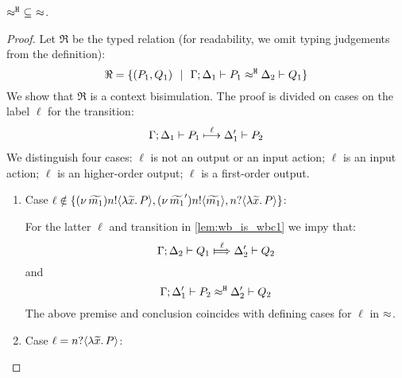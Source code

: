
\begin{lemma}
	\label{app:lem:wb_is_wbc}
	$\approx^\mathtt{H}\ \subseteq\ \approx$.
\end{lemma}

\begin{proof}
	Let $\Re$ be the typed relation (for readability, we omit typing judgements from the definition):
	\[
		\Re = \{(P_1, Q_1) \ \ |\ \  \Gamma; \Delta_1 \vdash P_1 \approx^\mathtt{H} \Delta_2 \vdash Q_1\}
	\]
	We show that $\Re$ is a context bisimulation.
	The proof is divided on cases on the label $\ell$ for the transition:
%
	\begin{eqnarray}
		\Gamma; \Delta_1 \vdash P_1 \stackrel{\ell}{\longmapsto} \Delta_1' \vdash P_2
		\label{lem:wb_is_wbc1}
	\end{eqnarray}
%
We distinguish four cases: $\ell$ is not an output or an input action; $\ell$ is an input action;
$\ell$ is an higher-order output; $\ell$ is a first-order output.
	\begin{enumerate}
		\item
				Case $\ell \notin \{ (\nu\, \widetilde{m_1}) n ! \langle \lambda \widetilde{x}.\,P \rangle,  (\nu\, \widetilde{m_1}') n ! \langle \widetilde{m_1} \rangle, n ? \langle \lambda \widetilde{x}.\,P \rangle \}$:

				\noi For the latter $\ell$ and transition in \eqref{lem:wb_is_wbc1} we impy that:	
				\[
					\horel{\Gamma}{\Delta_2}{Q_1}{\Hby{\ell}}{\Delta_2'}{Q_2}
				\]
				\noi and
				\[
					\Gamma; \Delta_1' \vdash P_2 \approx^\mathtt{H} \Delta_2' \vdash Q_2
				\]
				The above premise and conclusion coincides with defining cases for $\ell$ in $\approx$.

		\item	Case $\ell = n ? \langle \lambda \widetilde{x}.\,P \rangle$:


\end{enumerate}
\end{proof}
